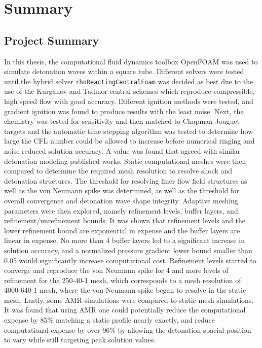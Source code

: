 \chapter{Summary}
\label{summary}

\section{Project Summary}
In this thesis, the computational fluid dynamics toolbox OpenFOAM was used to simulate detonation waves within a square tube. Different solvers were tested until the hybrid solver \verb|rhoReactingCentralFoam| was decided as best due to the use of the Kurganov and Tadmor central schemes which reproduce compressible, high speed flow with good accuracy. Different ignition methods were tested, and gradient ignition was found to produce results with the least noise. Next, the chemistry was tested for sensitivity and then matched to Chapman-Jouguet targets and the automatic time stepping algorithm was tested to determine how large the CFL number could be allowed to increase before numerical ringing and noise reduced solution accuracy. A value was found that agreed with similar detonation modeling published works. Static computational meshes were then compared to determine the required mesh resolution to resolve shock and detonation structures. The threshold for resolving finer flow field structures as well as the von Neumann spike was determined, as well as the threshold for overall convergence and detonation wave shape integrity. Adaptive meshing parameters were then explored, namely refinement levels, buffer layers, and refinement/unrefinement bounds. It was shown that refinement levels and the lower refinement bound are exponential in expense and the buffer layers are linear in expense. No more than 4 buffer layers led to a significant increase in solution accuracy, and a normalized pressure gradient lower bound smaller than 0.05 would significantly increase computational cost. Refinement levels started to converge and reproduce the von Neumann spike for 4 and more levels of refinement for the 250-40-1 mesh, which corresponds to a mesh resolution of 4000-640-1 mesh, where the von Neumann spike began to resolve in the static mesh. Lastly, some AMR simulations were compared to static mesh simulations. It was found that using AMR one could potentially reduce the computational expense by 85\% matching a static profile nearly exactly, and reduce computational expense by over 96\% by allowing the detonation spacial position to vary while still targeting peak solution values. 



